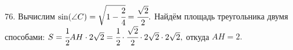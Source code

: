 76. Вычислим $\sin(\angle C)=\sqrt{1-\cfrac{2}{4}}=\cfrac{\sqrt{2}}{2}.$ Найдём площадь треугольника двумя способами: $S=\cfrac{1}{2}AH\cdot 2\sqrt{2}=\cfrac{1}{2}\cdot\cfrac{\sqrt{2}}{2}\cdot 2\sqrt{2}\cdot2\sqrt{2},$ откуда $AH=2.$\newpage\noindent
